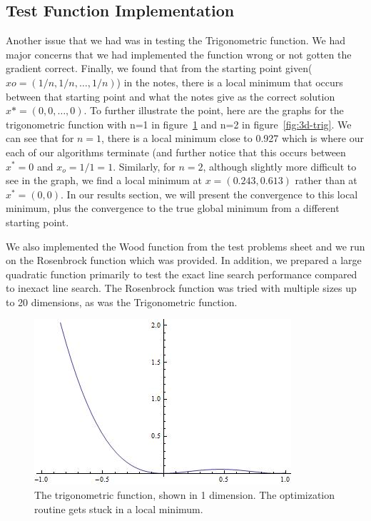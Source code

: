 \documentclass[12pt]{amsart}
\begin{document}
\subsection{Test Function Implementation}

Another issue that we had was in testing the Trigonometric function.  We had major concerns that we had implemented the function wrong or not gotten the gradient correct.  Finally, we found that from the starting point given($xo = (1/n, 1/n,\hdots,1/n)$) in the notes, there is a local minimum that occurs between that starting point and what the notes give as the correct solution $x* = (0,0,\hdots,0)$.  To further illustrate the point, here are the graphs for the trigonometric function with n=1 in figure~\ref{fig:2d-trig} and n=2 in figure~\ref{fig:3d-trig}.  We can see that for $n=1$, there is a local minimum close to 0.927 which is where our each of our algorithms terminate (and further notice that this occurs between $x^*=0$ and $x_o = 1/1 = 1$. Similarly, for $n=2$, although slightly more difficult to see in the graph, we find a local minimum at $x = (0.243, 0.613)$ rather than at $x^* = (0,0)$.  In our results section, we will present the convergence to this local minimum, plus the convergence to the true global minimum from a different starting point.

We also implemented the Wood function from the test problems sheet and we run on the Rosenbrock function which was provided.  In addition, we prepared a large quadratic function primarily to test the exact line search performance compared to inexact line search.  The Rosenbrock function was tried with multiple sizes up to 20 dimensions, as was the Trigonometric function.

\begin{figure}[thpb]
\centering
\includegraphics[scale=0.60]{images/2dtrig.jpg}
\caption{The trigonometric function, shown in 1 dimension.  The optimization routine gets stuck in a local minimum.}
\label{fig:2d-trig}
\end{figure}
\end{document}
